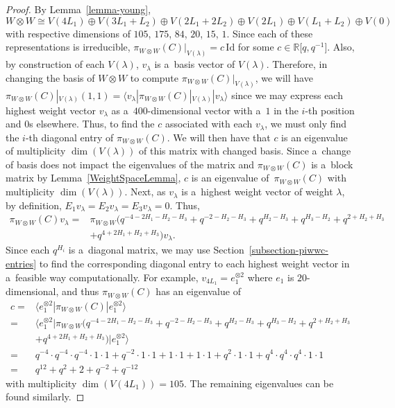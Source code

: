 \documentclass[pdftex]{sigma}
\numberwithin{equation}{section}
\theoremstyle{definition}
\begin{document}
\begin{proof}
 By Lemma~\ref{lemma-young},
 \[W \otimes W \cong V(4L_1) \oplus V(3L_1+L_2) \oplus V(2L_1+2L_2) \oplus V(2L_1) \oplus V(L_1+L_2) \oplus V(0)\]
 with respective dimensions of $105$, $175$, $84$, $20$, $15$, $1$. Since each of these representations is irreducible, $\pi_{W \otimes W}(C)|_{V(\lambda)} = c\,\mathrm{Id}$ for some $c \in \mathbb{R}\big[q,q^{-1}\big]$. Also, by construction of each $V(\lambda)$, $v_\lambda$ is a~basis vector of $V(\lambda)$. Therefore, in changing the basis of $W \otimes W$ to compute $\pi_{W \otimes W}(C)|_{V(\lambda)}$, we will have
 $\pi_{W \otimes W}(C)|_{V(\lambda)}(1,1) = \langle v_\lambda|\pi_{W \otimes W}(C)|_{V(\lambda)}|v_\lambda \rangle$
 since we may express each highest weight vector $v_\lambda$ as a~$400$-dimensional vector with a~$1$ in the $i$-th position and $0$s elsewhere. Thus, to find the $c$ associated with each $v_\lambda$, we must only find the $i$-th diagonal entry of $\pi_{W \otimes W}(C)$. We will then have that $c$ is an eigenvalue of multiplicity $\operatorname{dim}(V(\lambda))$ of this matrix with changed basis. Since a~change of basis does not impact the eigenvalues of the matrix and $\pi_{W \otimes W}(C)$ is a~block matrix by Lemma~\ref{WeightSpaceLemma}, $c$ is an eigenvalue of~$\pi_{W \otimes W}(C)$ with multiplicity $\operatorname{dim}(V(\lambda))$.
 Next, as $v_\lambda$ is a~highest weight vector of weight $\lambda$, by definition, $E_1v_\lambda = E_2v_\lambda = E_3v_\lambda = 0$.
 Thus,
 \begin{align*}
 \pi_{W \otimes W}(C)v_\lambda ={}& \pi_{W \otimes W}\bigl(q^{-4-2H_1-H_2-H_3}
 +q^{-2-H_2-H_3}
 +q^{H_2-H_3}
 +q^{H_3-H_2}
 +q^{2+H_2+H_3}\\
 &
 +q^{4+2H_1+H_2+H_3}\bigr)v_\lambda.
 \end{align*}
 Since each $q^{H_i}$ is a~diagonal matrix, we may use Section~\ref{subsection-piwwc-entries} to find the corresponding diagonal entry to each highest weight vector in a~feasible way computationally. For example, $v_{4L_1} = e_1^{\otimes 2}$ where $e_1$ is $20$-dimensional, and thus $\pi_{W \otimes W}(C)$ has an eigenvalue of
 \begin{align*}
 c ={}& \big\langle e_1^{\otimes 2}|\pi_{W \otimes W}(C)|e_1^{\otimes 2} \big\rangle \\
 ={}&\big\langle e_1^{\otimes 2}|\pi_{W \otimes W}\bigl(q^{-4-2H_1-H_2-H_3}
 +q^{-2-H_2-H_3}
 +q^{H_2-H_3}
 +q^{H_3-H_2}
 +q^{2+H_2+H_3}\\
 &
 +q^{4+2H_1+H_2+H_3}\bigr)| e_1^{\otimes 2}\big\rangle \\
 ={}& q^{-4}\cdot q^{-4} \cdot q^{-4} \cdot 1 \cdot 1 + q^{-2}\cdot 1 \cdot 1+1\cdot 1+1\cdot 1+q^2\cdot 1\cdot 1 +q^4\cdot q^4\cdot q^4\cdot 1\cdot 1 \\
 ={}& q^{12}+q^2+2+q^{-2}+q^{-12}
 \end{align*}
 with multiplicity $\operatorname{dim}(V(4L_1)) = 105$. The remaining eigenvalues can be found similarly.
\end{proof}
\end{document}

